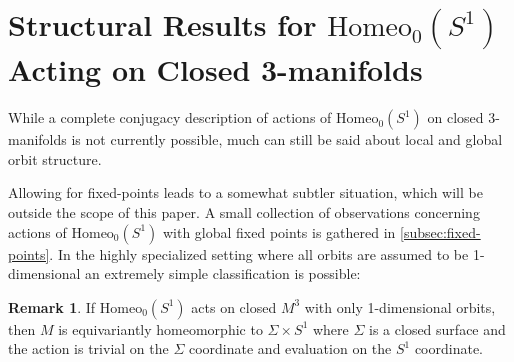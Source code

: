 \documentclass[10pt, oneside]{article}
\newcommand{\SO}[1][2]{\text{SO}(#1)}
\newcommand{\homeo}[1][S^1]{\text{Homeo}_0(#1)}
\newcommand{\cl}[1]{\overline{#1}}
\newtheorem{thm}{Theorem}[section]
\theoremstyle{definition}
\newtheorem{rem}{Remark}[section]
\theoremstyle{definition}
\begin{document}
\section{Structural Results for \texorpdfstring{$\homeo$}{Homeo\_0(S\string^1)} Acting on Closed 3-manifolds}\label{sec:homeos1}
While a complete conjugacy description of actions of $\homeo$ on closed 3-manifolds is not currently possible, much can still be said about local and global orbit structure. 

\mainstructure*

Allowing for fixed-points leads to a somewhat subtler situation, which will be outside the scope of this paper. A small collection of observations concerning actions of $\homeo$ with global fixed points is gathered in \cref{subsec:fixed-points}. In the highly specialized setting where all orbits are assumed to be 1-dimensional an extremely simple classification is possible:

\begin{rem}\label{rem:only-1d-orbs}
    If $\homeo$ acts on closed $M^3$ with only 1-dimensional orbits, then $M$ is equivariantly homeomorphic to $\Sigma \times S^1$ where $\Sigma$ is a closed surface and the action is trivial on the $\Sigma$ coordinate and evaluation on the $S^1$ coordinate.
\end{rem}
\end{document}
